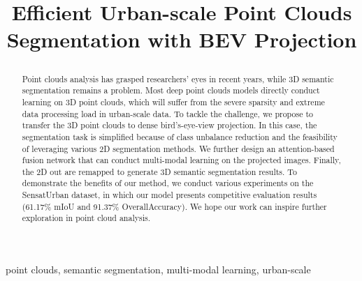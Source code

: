 \documentclass[conference]{IEEEtran}
\begin{document}
\title{Efficient Urban-scale Point Clouds Segmentation with BEV Projection


\author{
\and
{}
}
}



\maketitle

\begin{abstract}
Point clouds analysis has grasped researchers' eyes in recent years, while 3D semantic segmentation remains a problem. Most deep point clouds models directly conduct learning on 3D point clouds, which will suffer from the severe sparsity and extreme data processing load in urban-scale data. To tackle the challenge, we propose to transfer the 3D point clouds to dense bird's-eye-view projection. In this case, the segmentation task is simplified because of class unbalance reduction and the feasibility of leveraging various 2D segmentation methods. We further design an attention-based fusion network that can conduct multi-modal learning on the projected images. Finally, the 2D out are remapped to generate 3D semantic segmentation results. To demonstrate the benefits of our method, we conduct various experiments on the SensatUrban dataset, in which our model presents competitive evaluation results (61.17\% mIoU and 91.37\% OverallAccuracy). We hope our work can inspire further exploration in point cloud analysis.

\end{abstract}

\begin{IEEEkeywords}
point clouds, semantic segmentation, multi-modal learning, urban-scale
\end{IEEEkeywords}
\end{document}
